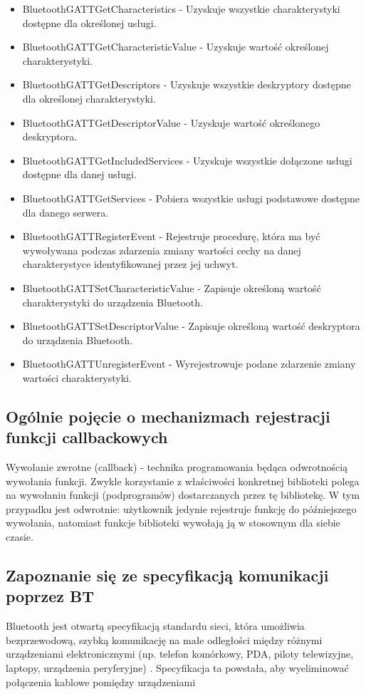 \documentclass[a4paper,12pt]{extarticle}  %
\begin{document}
\begin{enumerate}
\begin{itemize}
		\item BluetoothGATTGetCharacteristics - Uzyskuje wszystkie charakterystyki dostępne dla określonej usługi.
		\item BluetoothGATTGetCharacteristicValue - Uzyskuje wartość określonej charakterystyki.
		\item BluetoothGATTGetDescriptors - Uzyskuje wszystkie deskryptory dostępne dla określonej charakterystyki.
		\item BluetoothGATTGetDescriptorValue - Uzyskuje wartość określonego deskryptora.
		\item BluetoothGATTGetIncludedServices - Uzyskuje wszystkie dołączone usługi dostępne dla danej usługi.
		\item BluetoothGATTGetServices - Pobiera wszystkie usługi podstawowe dostępne dla danego serwera.
		\item BluetoothGATTRegisterEvent - Rejestruje procedurę, która ma być wywoływana podczas zdarzenia zmiany wartości cechy na danej charakterystyce identyfikowanej przez jej uchwyt.
		\item BluetoothGATTSetCharacteristicValue - Zapisuje określoną wartość charakterystyki do urządzenia Bluetooth.
		\item BluetoothGATTSetDescriptorValue - Zapisuje określoną wartość deskryptora do urządzenia Bluetooth.
		\item BluetoothGATTUnregisterEvent - Wyrejestrowuje podane zdarzenie zmiany wartości charakterystyki.
	\end{itemize}
\end{enumerate}
\subsection{Ogólnie pojęcie o mechanizmach rejestracji funkcji callbackowych}
Wywołanie zwrotne (callback) - technika programowania będąca odwrotnością wywołania funkcji. Zwykle korzystanie z właściwości konkretnej biblioteki polega na wywołaniu funkcji (podprogramów) dostarczanych przez tę bibliotekę. W tym przypadku jest odwrotnie: użytkownik jedynie rejestruje funkcję do późniejszego wywołania, natomiast funkcje biblioteki wywołają ją w stosownym dla siebie czasie. 
\subsection{Zapoznanie się ze specyfikacją komunikacji poprzez BT}
Bluetooth jest otwartą specyfikacją standardu sieci, która umożliwia bezprzewodową, 
szybką komunikację na małe odległości między różnymi urządzeniami elektronicznymi (np. 
telefon komórkowy, PDA, piloty telewizyjne, laptopy, urządzenia peryferyjne) . Specyfikacja 
ta powstała, aby wyeliminować połączenia kablowe pomiędzy urządzeniami
\end{document}
